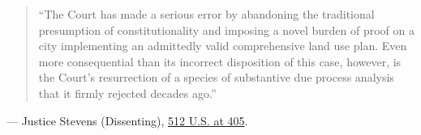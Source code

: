 \documentclass[12pt]{article}
\begin{document}
\begin{quote}
``The Court has made a serious error by abandoning the traditional presumption of constitutionality and imposing a novel burden of proof on a city implementing an admittedly valid comprehensive land use plan. Even more consequential than its incorrect disposition of this case, however, is the Court's resurrection of a species of substantive due process analysis that it firmly rejected decades ago.''
\end{quote}
\noindent --- Justice Stevens (Dissenting), \href{https://supreme.justia.com/cases/federal/us/512/374/}{512 U.S. at 405}.
\end{document}
